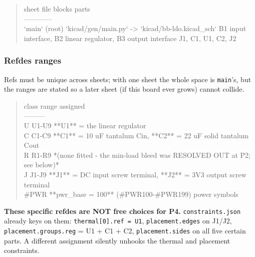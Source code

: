 \documentclass[11pt,a4paper]{article}
\begin{document}
\begin{quote}\small\ttfamily\raggedright
\textbar{} sheet \textbar{} file \textbar{} blocks \textbar{} parts \textbar{}\\
\textbar{}---\textbar{}---\textbar{}---\textbar{}---\textbar{}\\
\textbar{} `main` (root) \textbar{} `kicad/gen/main.py` -\textgreater{} `kicad/bb-ldo.kicad\_sch` \textbar{} B1 input interface, B2 linear regulator, B3 output interface \textbar{} J1, C1, U1, C2, J2 \textbar{}
\end{quote}
\subsubsection*{Refdes ranges}
Refs must be unique across sheets; with one sheet the whole space is \texttt{main}'s, but the ranges are stated so a later sheet (if this board ever grows) cannot collide.

\begin{quote}\small\ttfamily\raggedright
\textbar{} class \textbar{} range \textbar{} assigned \textbar{}\\
\textbar{}---\textbar{}---\textbar{}---\textbar{}\\
\textbar{} U \textbar{} U1-U9 \textbar{} {*}{*}U1{*}{*} = the linear regulator \textbar{}\\
\textbar{} C \textbar{} C1-C9 \textbar{} {*}{*}C1{*}{*} = 10 uF tantalum Cin, {*}{*}C2{*}{*} = 22 uF solid tantalum Cout \textbar{}\\
\textbar{} R \textbar{} R1-R9 \textbar{} {*}(none fitted - the min-load bleed was RESOLVED OUT at P2; see below){*} \textbar{}\\
\textbar{} J \textbar{} J1-J9 \textbar{} {*}{*}J1{*}{*} = DC input screw terminal, {*}{*}J2{*}{*} = 3V3 output screw terminal \textbar{}\\
\textbar{} \#PWR \textbar{} {*}{*}pwr\_base = 100{*}{*} (\#PWR100-\#PWR199) \textbar{} power symbols \textbar{}
\end{quote}
\textbf{These specific refdes are NOT free choices for P4.} \texttt{constraints.json} already keys on them: \texttt{thermal{[}0{]}.ref = U1}, \texttt{placement.edges} on J1/J2, \texttt{placement.groups.reg} = U1 + C1 + C2, \texttt{placement.sides} on all five certain parts. A different assignment silently unhooks the thermal and placement constraints.
\end{document}
